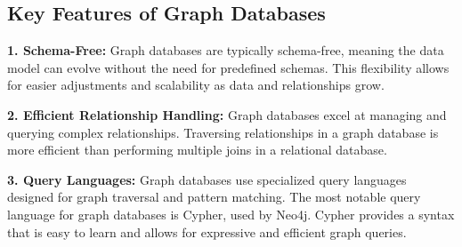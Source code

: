 \subsection{Key Features of Graph Databases}

\textbf{1. Schema-Free:} Graph databases are typically schema-free, meaning the data model can evolve without the need for predefined schemas. This flexibility allows for easier adjustments and scalability as data and relationships grow.

\textbf{2. Efficient Relationship Handling:} Graph databases excel at managing and querying complex relationships. Traversing relationships in a graph database is more efficient than performing multiple joins in a relational database.

\textbf{3. Query Languages:} Graph databases use specialized query languages designed for graph traversal and pattern matching. The most notable query language for graph databases is Cypher, used by Neo4j. Cypher provides a syntax that is easy to learn and allows for expressive and efficient graph queries.






